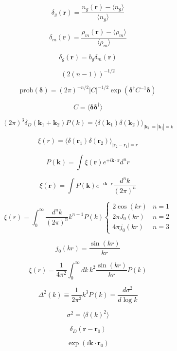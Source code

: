 \documentclass[12pt]{article}
\providecommand{\vecsymbol}[1]{\ensuremath{\boldsymbol{#1}}}
\providecommand{\rv}{\vecsymbol{r}}
\providecommand{\kv}{\vecsymbol{k}}
\providecommand{\delv}{\vecsymbol{\delta}}
\begin{document}
$$
\delta_g(\rv) = \frac{n_g(\rv) - \langle n_g\rangle}{\langle n_g\rangle}
$$

$$
\delta_m(\rv) = \frac{\rho_m(\rv) - \langle \rho_m\rangle}{\langle \rho_m\rangle}
$$

$$
\delta_g(\rv) = b_g \delta_m(\rv)
$$

$$
\left( 2(n-1) \right)^{-1/2}
$$

$$
\text{prob}(\delv) = (2\pi)^{-n/2} |C|^{-1/2} \exp\left(
\delv^\dagger C^{-1} \delv \right)
$$

$$
C = \langle \delv \delv^\dagger \rangle
$$

$$
(2\pi)^3 \delta_D(\kv_1 + \kv_2) P(k) = \langle \delta(\kv_1)\delta(\kv_2) \rangle_{|\kv_i|=|\kv_j|=k}
$$

$$
\xi(r) = \langle \delta(\rv_1)\delta(\rv_2)\rangle_{|\rv_2-\rv_1|=r}
$$

$$
P(\kv) = \int \xi(\rv) e^{+ i \kv\cdot\rv} d^n r
$$

$$
\xi(\rv) = \int P(\kv) e^{- i \kv\cdot\rv} \frac{d^n k}{(2\pi)^n}
$$

$$
\xi(r) = \int_0^\infty \frac{d^n k}{(2\pi)^n} k^{n-1} P(k) \begin{cases}
2 \cos(k r) & n = 1 \\
2\pi J_0(k r) & n = 2 \\
4\pi j_0(k r) & n = 3
\end{cases}
$$

$$
j_0(k r) = \frac{\sin(k r)}{k r}
$$

$$
\xi(r) = \frac{1}{4\pi^2} \int_0^\infty dk\,k^2 \frac{\sin(k r)}{k r} P(k)
$$

$$
\Delta^2(k) \equiv \frac{1}{2\pi^2} k^3 P(k) = \frac{d\sigma^2}{d\log k}
$$

$$
\sigma^2 = \langle \delta(k)^2 \rangle
$$

$$
\delta_D(\rv - \rv_0)
$$

$$
\exp(i \kv\cdot\rv_0)
$$


\end{document}
